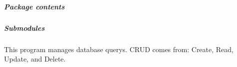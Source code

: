 \documentclass[a4paper,landscape,10pt,english]{sphinxmanual}
\begin{document}
\subparagraph{Package contents}
\label{\detokenize{code_docs/simulation_api.model:module-simulation_api.model}}\label{\detokenize{code_docs/simulation_api.model:package-contents}}

\subparagraph{Submodules}
\label{\detokenize{code_docs/simulation_api.model:submodules}}

\subparagraph{}
\label{\detokenize{code_docs/simulation_api.model:module-simulation_api.model.crud}}\label{\detokenize{code_docs/simulation_api.model:simulation-api-model-crud}}
This program manages database querys.
CRUD comes from: Create, Read, Update, and Delete.
\end{document}
